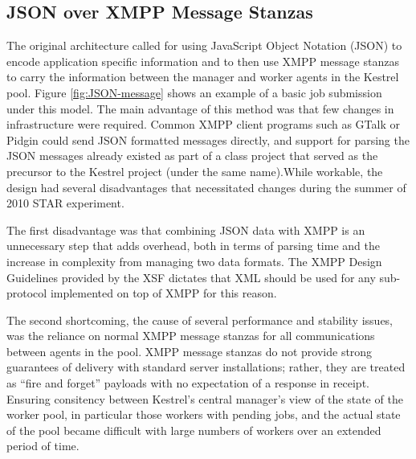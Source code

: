\subsection{JSON over XMPP Message Stanzas}
The original architecture called for using JavaScript Object Notation (JSON)
\cite{Crockford} to encode application specific information and to then use XMPP
message stanzas to carry the information between the manager and worker agents
in the Kestrel pool. Figure \ref{fig:JSON-message} shows an example of a basic
job submission under this model. The main advantage of this method was that few
changes in infrastructure were required. Common XMPP client programs such as
GTalk or Pidgin could send JSON formatted messages directly, and support for
parsing the JSON messages already existed as part of a class project that served
as the precursor to the Kestrel project (under the same name).While workable,
the design had several disadvantages that necessitated changes during the summer
of 2010 STAR experiment.

The first disadvantage was that combining JSON data with XMPP is an unnecessary
step that adds overhead, both in terms of parsing time and the increase
in complexity from managing two data formats. The XMPP Design Guidelines \cite{XEP-0134}
provided by the XSF \cite{XSF} dictates that XML should be used for any sub-protocol
implemented on top of XMPP for this reason.

The second shortcoming, the cause of several performance and stability issues, was
the reliance on normal XMPP message stanzas for all communications between agents in
the pool. XMPP message stanzas do not provide strong guarantees of delivery with 
standard server installations; rather, they are treated as ``fire and forget'' payloads
\cite{Saint-Andre2004a} with no expectation of a response in receipt. Ensuring consitency
between Kestrel's central manager's view of the state of the worker pool, in particular
those workers with pending jobs, and the actual state of the pool became difficult with
large numbers of workers over an extended period of time.

